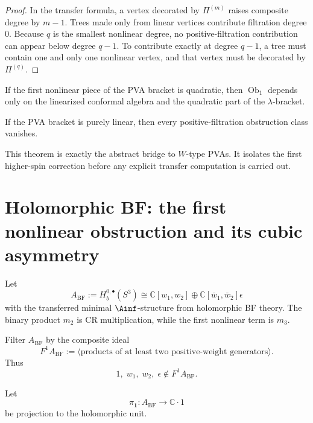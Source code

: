 \begin{proof}
In the transfer formula, a vertex decorated by $\Pi^{(m)}$ raises composite degree by $m-1$. Trees made only from linear vertices contribute filtration degree $0$. Because $q$ is the smallest nonlinear degree, no positive-filtration contribution can appear below degree $q-1$. To contribute exactly at degree $q-1$, a tree must contain one and only one nonlinear vertex, and that vertex must be decorated by $\Pi^{(q)}$.
\end{proof}

\begin{corollary}
\label{cor:cbt-quadratic-control}
\ClaimStatusProvedHere
If the first nonlinear piece of the PVA bracket is quadratic, then $\operatorname{Ob}_1$ depends only on the linearized conformal algebra and the quadratic part of the $\lambda$-bracket.
\end{corollary}

\begin{corollary}
\label{cor:cbt-current-type-rigidity}
\ClaimStatusProvedHere
If the PVA bracket is purely linear, then every positive-filtration obstruction class vanishes.
\end{corollary}

\begin{remark}
\label{rem:cbt-bridge-to-w-type}
This theorem is exactly the abstract bridge to $W$-type PVAs. It isolates the first higher-spin correction before any explicit transfer computation is carried out.
\end{remark}

\section{Holomorphic BF: the first nonlinear obstruction and its cubic asymmetry}
\label{sec:cbt-holomorphic-bf-obstruction}

Let
\[
A_{\mathrm{BF}}:=H_b^{0,\bullet}(S^3)\cong \mathbb{C}[w_1,w_2]\oplus \mathbb{C}[\bar w_1,\bar w_2]\epsilon
\]
with the transferred minimal $\Ainf$-structure from holomorphic BF theory. The binary product $m_2$ is CR multiplication, while the first nonlinear term is $m_3$.

Filter $A_{\mathrm{BF}}$ by the composite ideal
\[
F^1A_{\mathrm{BF}}:=\langle \text{products of at least two positive-weight generators}\rangle.
\]
Thus
\[
1,\; w_1,\; w_2,\; \epsilon \notin F^1A_{\mathrm{BF}}.
\]

Let
\[
\pi_{\mathbf 1}:A_{\mathrm{BF}}\to \mathbb{C}\cdot 1
\]
be projection to the holomorphic unit.

